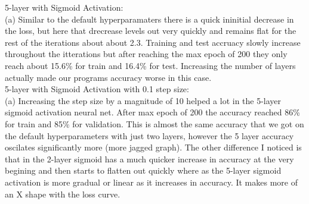 \documentclass{article}
\begin{document}
5-layer with Sigmoid Activation:\\[1em]
(a) Similar to the default hyperparamaters there is a quick ininitial decrease in the loss, but here that drecrease levels out very quickly and remains flat for the rest of the iterations about about 2.3. Training and test accruacy slowly increase throughout the itterations but after reaching the max epoch of 200 they only reach about 15.6\% for train and 16.4\% for test. Increasing the number of layers actually made our programs accuracy worse in this case.\\[1em]
5-layer with Sigmoid Activation with 0.1 step size: \\[1em]
(a) Increasing the step size by a magnitude of 10 helped a lot in the 5-layer sigmoid activation neural net. After max epoch of 200 the accuracy reached 86\% for train and 85\% for validation. This is almost the same accuracy that we got on the default hyperparameters with just two layers, however the 5 layer accuracy oscilates significantly more (more jagged graph). The other difference I noticed is that in the 2-layer sigmoid has a much quicker increase in accuracy at the very begining and then starts to flatten out quickly where as the 5-layer sigmoid activation is more gradual or linear as it increases in accuracy. It makes more of an X shape with the loss curve. \\[1em]
\end{document}
